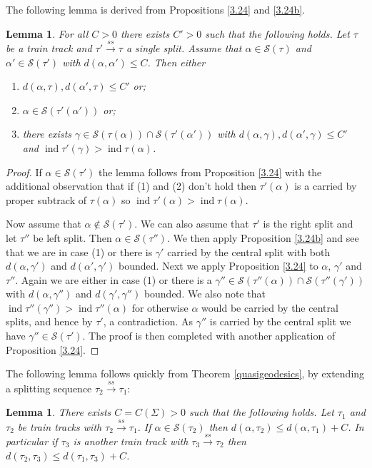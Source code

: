 \documentclass[11pt]{article}
\newtheorem{lemma}[thm]{Lemma}
\theoremstyle{remark}
\def\S{{\mathcal S}}
\def\ind{\operatorname{ind}}
\def\ss{{\overset{ss}\longrightarrow}}
\begin{document}
 The following lemma is derived from Propositions \ref{3.24} and \ref{3.24b}.

\begin{lemma}\label{nested_induction}
For all $C>0$ there exists $C'>0$ such that the following holds. Let $\tau$ be a train track and $\tau'\ss\tau$ a single split. Assume that $\alpha \in \S(\tau)$ and $\alpha' \in \S(\tau')$ with $d(\alpha, \alpha') \le C$. Then either
\begin{enumerate}[(1)]
\item $d(\alpha, \tau), d(\alpha', \tau) \le C'$ or;
\item $\alpha \in \S(\tau'(\alpha'))$ or;
\item there exists $\gamma \in \S(\tau(\alpha)) \cap \S(\tau'(\alpha'))$ with $d(\alpha, \gamma), d(\alpha',\gamma) \le C'$ and $\ind{\tau'}(\gamma)> \ind{\tau}(\alpha)$.
\end{enumerate}
\end{lemma}

\begin{proof}
If $\alpha \in \S(\tau')$ the lemma follows from Proposition \ref{3.24} with the additional observation that if (1) and (2) don't hold then $\tau'(\alpha)$ is a carried by proper subtrack of $\tau(\alpha)$ so $\ind \tau'(\alpha) > \ind \tau(\alpha)$.

Now assume that $\alpha \not\in \S(\tau')$. We can also assume that $\tau'$ is the right split and let $\tau''$ be left split. Then $\alpha \in \S(\tau'')$.
 We then apply Proposition \ref{3.24b} and see that we are in case (1) or there is $\gamma'$ carried by the central split with both $d(\alpha, \gamma')$ and $d(\alpha', \gamma')$ bounded. Next we apply Proposition \ref{3.24} to $\alpha$, $\gamma'$ and $\tau''$. Again we are either in case (1) or there is a $\gamma'' \in \S(\tau''(\alpha)) \cap \S(\tau''(\gamma'))$ with $d(\alpha, \gamma'')$ and $d(\gamma', \gamma'')$ bounded. We also note that $\ind\tau''(\gamma'') > \ind \tau''(\alpha)$ for otherwise $\alpha$ would be carried by the central splits, and hence by $\tau'$, a contradiction.  As $\gamma''$ is carried by the central split  we have $\gamma'' \in \S(\tau')$. The proof is then completed with another application of Proposition \ref{3.24}.
\end{proof}


The following lemma follows quickly from Theorem \ref{quasigeodesics}, by extending
a splitting sequence $\tau_2 \ss \tau_1$:

\begin{lemma}\label{split_to_quasi}
There exists $C = C(\Sigma)>0$ such that the following holds. Let $\tau_1$ and $\tau_2$ be train tracks with $\tau_2 \ss \tau_1$. If $\alpha \in \S(\tau_2)$ then $d(\alpha, \tau_2) \le d(\alpha, \tau_1) + C$. In particular if $\tau_3$ is another train track with $\tau_3 \ss\tau_2$ then $d(\tau_2, \tau_3) \le d(\tau_1,\tau_3) + C$.
\end{lemma}
\end{document}
